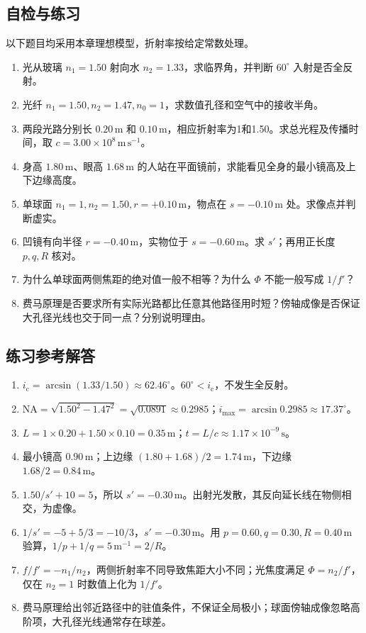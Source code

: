 \documentclass[UTF8,fontset=none,zihao=-4,a4paper]{ctexart}
\newcommand{\unit}[1]{\,\mathrm{#1}}
\begin{document}
\subsection{自检与练习}
以下题目均采用本章理想模型，折射率按给定常数处理。
\begin{enumerate}
\item 光从玻璃 $n_1=1.50$ 射向水 $n_2=1.33$，求临界角，并判断 $60^\circ$ 入射是否全反射。
\item 光纤 $n_1=1.50,n_2=1.47,n_0=1$，求数值孔径和空气中的接收半角。
\item 两段光路分别长 $0.20\unit m$ 和 $0.10\unit m$，相应折射率为1和1.50。求总光程及传播时间，取 $c=3.00\times10^8\unit{m\,s^{-1}}$。
\item 身高 $1.80\unit m$、眼高 $1.68\unit m$ 的人站在平面镜前，求能看见全身的最小镜高及上下边缘高度。
\item 单球面 $n_1=1,n_2=1.50,r=+0.10\unit m$，物点在 $s=-0.10\unit m$ 处。求像点并判断虚实。
\item 凹镜有向半径 $r=-0.40\unit m$，实物位于 $s=-0.60\unit m$。求 $s'$；再用正长度 $p,q,R$ 核对。
\item 为什么单球面两侧焦距的绝对值一般不相等？为什么 $\Phi$ 不能一般写成 $1/f'$？
\item 费马原理是否要求所有实际光路都比任意其他路径用时短？傍轴成像是否保证大孔径光线也交于同一点？分别说明理由。
\end{enumerate}

\subsection{练习参考解答}
\begin{enumerate}
\item $i_{\mathrm c}=\arcsin(1.33/1.50)\approx62.46^\circ$。$60^\circ<i_{\mathrm c}$，不发生全反射。
\item $\mathrm{NA}=\sqrt{1.50^2-1.47^2}=\sqrt{0.0891}\approx0.2985$；$i_{\max}=\arcsin0.2985\approx17.37^\circ$。
\item $L=1\times0.20+1.50\times0.10=0.35\unit m$；$t=L/c\approx1.17\times10^{-9}\unit s$。
\item 最小镜高 $0.90\unit m$；上边缘 $(1.80+1.68)/2=1.74\unit m$，下边缘 $1.68/2=0.84\unit m$。
\item $1.50/s'+10=5$，所以 $s'=-0.30\unit m$。出射光发散，其反向延长线在物侧相交，为虚像。
\item $1/s'=-5+5/3=-10/3$，$s'=-0.30\unit m$。用 $p=0.60,q=0.30,R=0.40\unit m$ 验算，$1/p+1/q=5\unit{m^{-1}}=2/R$。
\item $f/f'=-n_1/n_2$，两侧折射率不同导致焦距大小不同；光焦度满足 $\Phi=n_2/f'$，仅在 $n_2=1$ 时数值上化为 $1/f'$。
\item 费马原理给出邻近路径中的驻值条件，不保证全局极小；球面傍轴成像忽略高阶项，大孔径光线通常存在球差。
\end{enumerate}
\end{document}
